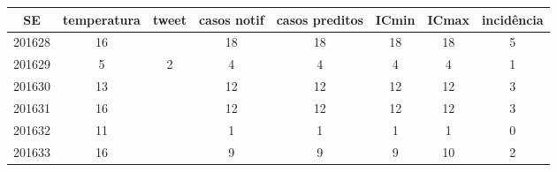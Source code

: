 \begin{tabular}{c|ccccccc}
  \hline
SE & temperatura & tweet & casos notif & casos preditos & ICmin & ICmax & incidência \\ 
  \hline
201628 & 16 &  & 18 & 18 & 18 & 18 & 5 \\ 
  201629 & 5 & 2 & 4 & 4 & 4 & 4 & 1 \\ 
  201630 & 13 &  & 12 & 12 & 12 & 12 & 3 \\ 
  201631 & 16 &  & 12 & 12 & 12 & 12 & 3 \\ 
  201632 & 11 &  & 1 & 1 & 1 & 1 & 0 \\ 
  201633 & 16 &  & 9 & 9 & 9 & 10 & 2 \\ 
   \hline
\end{tabular}
